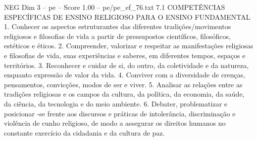 \begin{textsample}{NEG Dim 3 – pe – Score 1.00 – pe/pe\_ef\_76.txt}  \label{ex:f3_neg_015}
7.1 COMPETÊNCIAS ESPECÍFICAS DE ENSINO RELIGIOSO PARA O ENSINO FUNDAMENTAL 1.
Conhecer os aspectos estruturantes das diferentes tradições/movimentos religiosos e filosofias de vida a partir de pressupostos científicos, filosóficos, estéticos e éticos. 2.
Compreender, valorizar e respeitar as manifestações religiosas e filosofias de vida, suas experiências e saberes, em diferentes tempos, espaços e territórios. 3.
Reconhecer e cuidar de si, do outro, da coletividade e da natureza, enquanto expressão de valor da vida. 4.
Conviver com a diversidade de crenças, pensamentos, convicções, modos de ser e viver. 5.
Analisar as relações entre as tradições religiosas e os campos da cultura, da política, da economia, da saúde, da ciência, da tecnologia e do meio ambiente. 6.
Debater, problematizar e posicionar -se frente aos discursos e práticas de intolerância, discriminação e violência de cunho religioso, de modo a assegurar os direitos humanos no constante exercício da cidadania e da cultura de paz.

\end{textsample}
